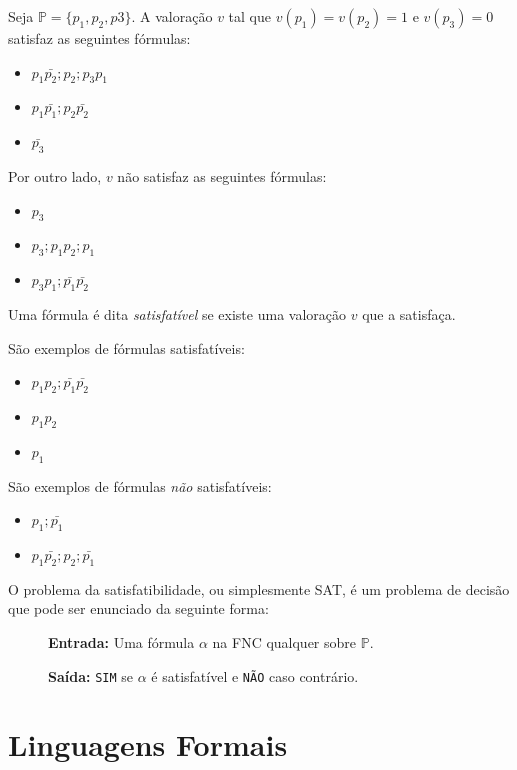\begin{example}
Seja $\mathbb{P} = \{p_1, p_2, p3\}$. A valoração $v$ tal que $v(p_1) = v(p_2) = 1$ e $v(p_3) = 0$ satisfaz as seguintes fórmulas:

\begin{itemize}
\item[] $p_1\bar{p_2};p_2;p_3p_1$
\item[] $p_1\bar{p_1};p_2\bar{p_2}$
\item[] $\bar{p_3}$
\end{itemize}

Por outro lado, $v$ não satisfaz as seguintes fórmulas:
\begin{itemize}
\item[] $p_3$
\item[] $p_3;p_1p_2;p_1$
\item[] $p_3p_1;\bar{p_1}\bar{p_2}$
\end{itemize}
\end{example}

Uma fórmula é dita {\em satisfatível} se existe uma valoração $v$ que a satisfaça.


\begin{example}
  São exemplos de fórmulas satisfatíveis:
\begin{itemize}
\item[] $p_1p_2;\bar{p_1}\bar{p_2}$
\item[] $p_1p_2$
\item[] $p_1$
\end{itemize}

São exemplos de fórmulas {\em não} satisfatíveis:
\begin{itemize}
\item[] $p_1;\bar{p_1}$
\item[] $p_1\bar{p_2};p_2;\bar{p_1}$
\end{itemize}
\end{example}


O problema da satisfatibilidade, ou simplesmente SAT, é um problema de decisão que pode ser enunciado da seguinte forma:

  \begin{description}
  \item[] {\bf Entrada:} Uma fórmula $\alpha$ na FNC qualquer sobre $\mathbb{P}$.
  \item[] {\bf Saída:} {\tt SIM} se $\alpha$ é satisfatível e {\tt NÃO} caso contrário.
  \end{description}

\section{Linguagens Formais}
\label{sec:linguagens}

